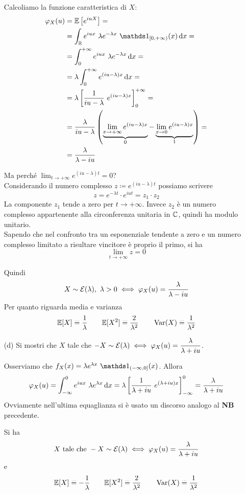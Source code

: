 \begin{enumerate}
Calcoliamo la funzione caratteristica di $X$:
\begin{gather*}
\begin{aligned}
\varphi_X(u)&=\EE\left[e^{iuX}  \right]=\\
&=\int_\RR e^{iux}\ \lambda e^{-\lambda x}\ \Ind_{[0,+\infty)}(x)\dx=\\
&=\int_0^{+\infty}e^{iux}\ \lambda e^{-\lambda x}\dx=\\
&=\lambda\int_0^{+\infty}e^{(iu-\lambda)x}\dx=\\
&=\lambda\left[\frac{1}{iu-\lambda}\ e^{(iu-\lambda)x}   \right]_0^{+\infty}=\\
&=\displaystyle\frac{\lambda}{iu-\lambda}\left( \underbrace{\lim_{x\to+\infty}e^{(iu-\lambda)x}}_{0}-\underbrace{\lim_{x\to 0}e^{(iu-\lambda)x}}_{1}   \right)=\\
&=\frac{\lambda}{\lambda-iu}
\end{aligned}
\end{gather*}
\begin{nb}
Ma perché $\displaystyle\lim_{t\to+\infty}e^{(iu-\lambda)t}=0$? \\
Considerando il numero complesso $z\coloneqq e^{(iu-\lambda)t}$ possiamo scrivere
\[
z=e^{-\lambda t}\cdot e^{iut}=z_1\cdot z_2
\]
La componente $z_1$ tende a zero per $t\to+\infty$. Invece $z_2$ è un numero complesso appartenente alla circonferenza unitaria in $\mathbb{C}$, quindi ha modulo unitario. \\
Sapendo che nel confronto tra un esponenziale tendente a zero e un numero complesso limitato a risultare vincitore è proprio il primo, si ha
\[
\displaystyle\lim_{t\to+\infty}z=0
\]
\end{nb}
Quindi
\[
X\sim\Ec(\lambda),\ \lambda>0\iff\varphi_X(u)=\frac{\lambda}{\lambda-iu}
\]
Per quanto riguarda media e varianza
\[
\mathbb{E}[X]\overset{\underset{\dots}{}}{=}\frac{1}{\lambda} \qquad \mathbb{E}[X^2]\overset{\underset{\dots}{}}{=}\frac{2}{\lambda^2}\qquad \operatorname{Var}(X)\overset{\underset{\dots}{}}{=}\frac{1}{\lambda^2}
\]

\item [(d)] Si mostri che $X$ tale che $-X\sim\mathcal{E}(\lambda)\iff\varphi_X(u)=\dfrac{\lambda}{\lambda+iu}$.

Osserviamo che $f_X(x)=\lambda e^{\lambda x}\ \Ind_{(-\infty,0]}(x)$. Allora
\[
\varphi_X(u)=\int_{-\infty}^0e^{iux}\ \lambda e^{\lambda x}\dx=\lambda\left[\frac{1}{\lambda+iu}\ e^{(\lambda+iu)x}   \right]_{-\infty}^{0}=\frac{\lambda}{\lambda+iu}
\]
Ovviamente nell'ultima equaglianza si è usato un discorso analogo al \textbf{NB} precedente.

Si ha
\[
X\text{ tale che }-X\sim\mathcal{E}(\lambda)\iff\varphi_X(u)=\dfrac{\lambda}{\lambda+iu}
\]
e
\[
\mathbb{E}[X]\overset{\underset{\dots}{}}{=}-\frac{1}{\lambda} \qquad \mathbb{E}[X^2]\overset{\underset{\dots}{}}{=}\frac{2}{\lambda^2}\qquad \operatorname{Var}(X)\overset{\underset{\dots}{}}{=}\frac{1}{\lambda^2}
\]
\end{enumerate}

